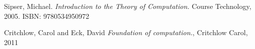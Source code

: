 \documentclass[12pt]{article}
\begin{document}
\vfill
\begin{thebibliography}{9}
Sipser, Michael. 
\textit{Introduction to the Theory of Computation.}
Course Technology, 2005. ISBN: 9780534950972

Critchlow, Carol and Eck, David
\textit{Foundation of computation.},
Critchlow Carol, 2011

\end{thebibliography}

 
\end{document}
